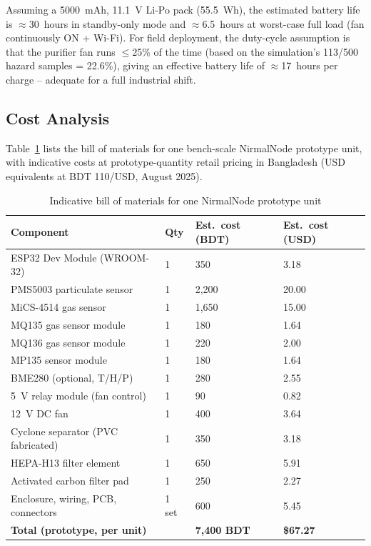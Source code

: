\noindent Assuming a 5000~mAh, 11.1~V Li-Po pack (55.5~Wh), the estimated battery life is $\approx$30~hours in standby-only mode and $\approx$6.5~hours at worst-case full load (fan continuously ON + Wi-Fi). For field deployment, the duty-cycle assumption is that the purifier fan runs $\leq$25\% of the time (based on the simulation's 113/500 hazard samples = 22.6\%), giving an effective battery life of $\approx$17~hours per charge -- adequate for a full industrial shift.

\subsection{Cost Analysis}
\label{sec:exp-cost}

Table~\ref{tab:exp-cost} lists the bill of materials for one bench-scale NirmalNode prototype unit, with indicative costs at prototype-quantity retail pricing in Bangladesh (USD equivalents at BDT 110/USD, August 2025).

\begin{table}[htbp]
\centering
\caption{Indicative bill of materials for one NirmalNode prototype unit}
\label{tab:exp-cost}
\begin{tabular}{@{}p{5.5cm}p{2.5cm}p{2.5cm}p{2.5cm}@{}}
\toprule
\textbf{Component} & \textbf{Qty} & \textbf{Est.\ cost (BDT)} & \textbf{Est.\ cost (USD)} \\
\midrule
ESP32 Dev Module (WROOM-32) & 1 & 350 & 3.18 \\
PMS5003 particulate sensor  & 1 & 2,200 & 20.00 \\
MiCS-4514 gas sensor        & 1 & 1,650 & 15.00 \\
MQ135 gas sensor module     & 1 & 180 & 1.64 \\
MQ136 gas sensor module     & 1 & 220 & 2.00 \\
MP135 sensor module         & 1 & 180 & 1.64 \\
BME280 (optional, T/H/P)    & 1 & 280 & 2.55 \\
5~V relay module (fan control) & 1 & 90 & 0.82 \\
12~V DC fan                 & 1 & 400 & 3.64 \\
Cyclone separator (PVC fabricated) & 1 & 350 & 3.18 \\
HEPA-H13 filter element     & 1 & 650 & 5.91 \\
Activated carbon filter pad & 1 & 250 & 2.27 \\
Enclosure, wiring, PCB, connectors & 1 set & 600 & 5.45 \\
\midrule
\textbf{Total (prototype, per unit)} & & \textbf{7,400 BDT} & \textbf{\$67.27} \\
\bottomrule
\end{tabular}
\end{table}

